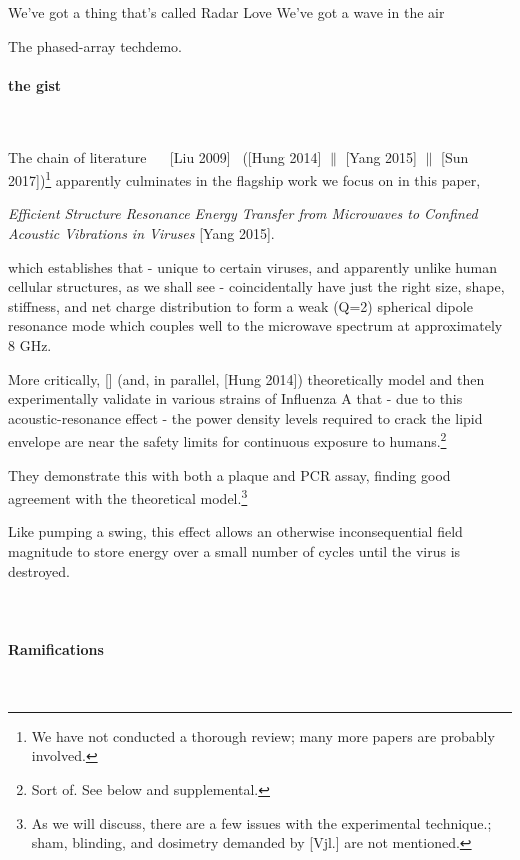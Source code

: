 \documentclass[fleqn,10pt]{article}
\begin{document}
\clearpage	
\begin{multicols}{1}



We've got a thing 
that's called 
Radar Love
We've got a wave
in the air

The phased-array techdemo.

\paragraph{{\Large the gist}}\

The chain of literature 
%
\cite{Longrange1968} \textrightarrow \ \cite{Biological1980} \textrightarrow \ [Liu 2009] \textrightarrow \ ([Hung 2014] $\parallel$ [Yang 2015] $\parallel$ [Sun 2017])\footnote{We have not conducted a thorough review; many more papers are probably involved.} apparently culminates in the flagship work we focus on in this paper,

{\it Efficient Structure Resonance Energy Transfer from Microwaves to Confined Acoustic Vibrations in Viruses} [Yang 2015].
%

which establishes that - unique to certain viruses, and apparently unlike human cellular structures, as we shall see - coincidentally have just the right size, shape, stiffness, and net charge distribution to form a weak (Q=2) spherical dipole resonance mode which couples well to the microwave spectrum at approximately 8 GHz.

More critically, [] (and, in parallel, [Hung 2014]) theoretically model and then experimentally validate in various strains of Influenza A that - due to this acoustic-resonance effect - the power density levels required to crack the lipid envelope are near the safety limits for continuous exposure to humans.\footnote{Sort of. See below and supplemental.}

They demonstrate this with both a plaque and PCR assay, finding good agreement with the theoretical model.\footnote{As we will discuss, there are a few issues with the experimental technique.; sham, blinding, and dosimetry demanded by [Vjl.] are not mentioned.}

Like pumping a swing, this effect allows an otherwise inconsequential field magnitude to store energy over a small number of cycles until the virus is destroyed. \\
\\\\

\paragraph{Ramifications}\


\end{multicols}
\end{document}
